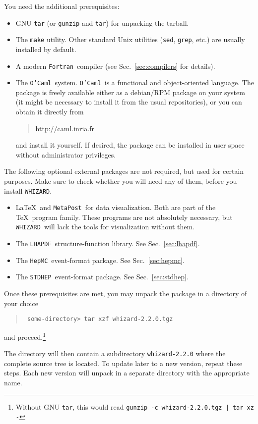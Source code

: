\documentclass[12pt]{book}
\newcommand{\ttt}[1]{\texttt{#1}}
\newcommand{\whizard}{\texttt{WHIZARD}}
\newcommand{\stdhep}{\texttt{STDHEP}}
\newcommand{\lhapdf}{\texttt{LHAPDF}}
\newcommand{\hepmc}{\texttt{HepMC}}
\newcommand{\metapost}{\texttt{MetaPost}}
\newcommand{\fortran}{\texttt{Fortran}}
\newcommand{\ocaml}{\texttt{O'Caml}}
\newcommand{\thisversion}{2.2.0}
\begin{document}
You need the additional prerequisites:
\begin{itemize}
\item
  GNU \ttt{tar} (or \ttt{gunzip} and \ttt{tar}) for unpacking the
  tarball.
\item
  The \ttt{make} utility.  Other standard Unix utilities (\ttt{sed},
  \ttt{grep}, etc.) are usually installed by default.
\item
  A modern \fortran\ compiler (see Sec.~\ref{sec:compilers} for
  details).
\item
  The \ocaml\ system.  \ocaml\ is a functional and object-oriented
  language.  The package is freely available either as a debian/RPM package
  on your system (it might be necessary to install it from the usual
  repositories), or you can obtain it directly from
  \begin{quote}
    \url{http://caml.inria.fr}
  \end{quote}
  and install it yourself.  If desired, the package can be installed
  in user space without administrator privileges.
\end{itemize}
The following optional external packages are not required, but used
for certain purposes.  Make sure to check whether you will need any of
them, before you install \whizard.
\begin{itemize}
\item
  \LaTeX\ and \metapost\ for data visualization.  Both are part of the
  \TeX\ program family.  These programs are not absolutely necessary,
  but \whizard\ will lack the tools for visualization without them.
\item
  The \lhapdf\ structure-function library.  See
  Sec.~\ref{sec:lhapdf}.
\item
  The \hepmc\ event-format package.  See Sec.~\ref{sec:hepmc}.
\item
  The \stdhep\ event-format package.  See Sec.~\ref{sec:stdhep}.
\end{itemize}
Once these prerequisites are met, you may unpack the package in a
directory of your choice
\begin{quote}\small\tt
  some-directory> tar xzf whizard-\thisversion.tgz
\end{quote}
and proceed.\footnote{Without GNU \ttt{tar}, this would read \ttt{\small gunzip -c whizard-\thisversion.tgz | tar xz -}}

The directory will then contain a subdirectory \ttt{whizard-\thisversion}
where the complete source tree is located.  To update later to a new
version, repeat these steps.  Each new version will unpack in a
separate directory with the appropriate name.
\end{document}
